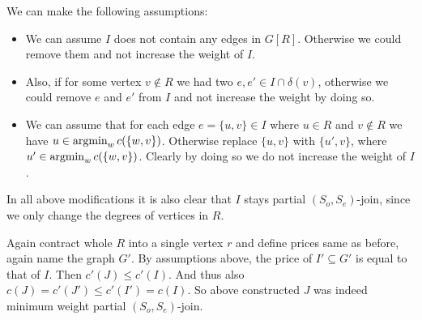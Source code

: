 \begin{exercise}{3}
    We can make the following assumptions:
    \begin{itemize}
        \item{We can assume $I$ does not contain any edges in $G[R]$. Otherwise
            we could remove them and not increase the weight of $I$.}
        \item{Also, if for some vertex $v \notin R$ we had two $e, e' \in I
            \cap \delta(v)$, otherwise we could remove $e$ and $e'$ from $I$ and 
            not increase the weight by doing so.}
        \item{We can assume that for each edge $e = \{u, v\} \in I$ where $u \in R$
            and $v \notin R$ we have $u \in \operatorname{argmin}_w c(\{w, v\})$. Otherwise
            replace $\{u, v\}$ with $\{u', v\}$, where $u' \in \operatorname{argmin}_w c(\{w,
            v\})$. Clearly by doing so we do not increase the weight of $I$.}
    \end{itemize}
    In all above modifications it is also clear that $I$ stays partial $(S_o,
    S_e)$-join, since we only change the degrees of vertices in $R$.

    Again contract whole $R$ into a single vertex $r$ and define prices same as
    before, again name the graph $G'$. By assumptions above, the price of $I'
    \subseteq G'$ is equal to that of $I$. Then $c'(J) \leq c'(I)$. And thus
    also $c(J) = c'(J') \leq c'(I') = c(I)$. So above constructed $J$ was indeed
    minimum weight partial $(S_o, S_e)$-join.
\end{exercise}


